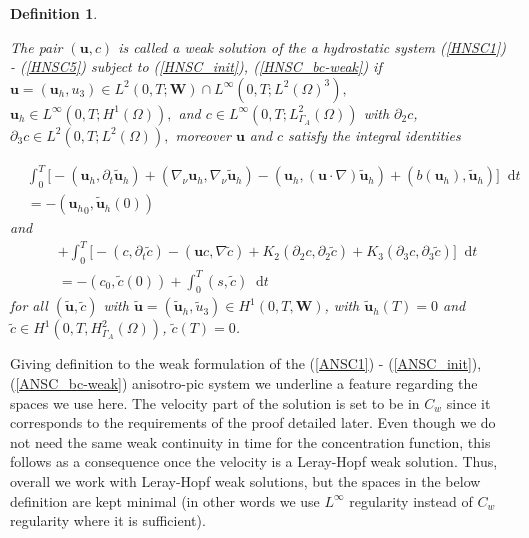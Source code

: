 \documentclass[11pt, a4paper]{article}
\newtheorem{definition}{Definition}
\newcommand*\diff{\mathop{}\!\mathrm{d}}
\begin{document}
\begin{definition} \label{definitionhydrostaticWF}

The pair $(\mathbf{u}, c)$ is called a weak solution of the a hydrostatic system (\ref{HNSC1}) - (\ref{HNSC5}) subject to (\ref{HNSC_init}), (\ref{HNSC_bc-weak}) if $\mathbf{u} = (\mathbf{u}_h, u_3) \in L^2 (0, T; \mathbf{W}) \cap L^\infty (0,T; L^2(\Omega)^3),$ $\mathbf{u}_h \in L^\infty(0,T; H^1(\Omega)),$ and $c \in L^\infty (0, T; L_{\Gamma_A}^2(\Omega))$ with $\partial_2 c$, $\partial_3 c \in L^2(0, T; L^2(\Omega)),$ moreover $\mathbf{u}$ and $c$ satisfy the integral identities

\begin{equation}
\begin{split}
& \int_0^T \bigg[ -(\mathbf{u}_h, \partial_t \mathbf{\tilde{u}}_h) + (\nabla_\nu \mathbf{u}_h, \nabla_\nu \mathbf{\tilde{u}}_h) - (\mathbf{u}_h, (\mathbf{u} \cdot \nabla) \mathbf{\tilde{u}}_h) + (b(\mathbf{u}_h), \mathbf{\tilde{u}}_h) \bigg ] \diff t \\
& = - ({\mathbf{u}_h}_0, \mathbf{\tilde{u}}_h(0)) \label{hydrostaticWF_u}
\end{split}
\end{equation}
%
and
%
\begin{equation}
\begin{split} 
&+ \int_0^T \bigg[ -(c, \partial_t \tilde{c}) -(\mathbf{u}c, \nabla \tilde{c}) + K_2 (\partial_2 c, \partial_2 \tilde{c}) + K_3 (\partial_3 c, \partial_3 \tilde{c}) \bigg ] \diff t \\
& = - (c_0, \tilde{c}(0)) + \int_0^T (s,\tilde{c}) \diff t \label{hydrostaticWF_c}
\end{split}
\end{equation}
%
for all $(\mathbf{\tilde{u}}, \tilde{c})$ with $\mathbf{\tilde{u}} = (\mathbf{\tilde{u}}_h, \tilde{u}_3) \in H^1 (0,T, \mathbf{W})$, with $\mathbf{\tilde{u}}_h (T) = 0$ and $\tilde{c} \in H^1 (0,T, H^2_{\Gamma_A} (\Omega))$, $\tilde{c} (T) = 0$.

\end{definition}

Giving definition to the weak formulation of the (\ref{ANSC1}) - (\ref{ANSC_init}), (\ref{ANSC_bc-weak}) anisotro-pic system we underline a feature regarding the spaces we use here. The velocity part of the solution is set to be in $C_w$ since it corresponds to the requirements of the proof detailed later. Even though we do not need the same weak continuity in time for the concentration function, this follows as a consequence once the velocity is a Leray-Hopf weak solution. Thus, overall we work with Leray-Hopf weak solutions, but the spaces in the below definition are kept minimal (in other words we use $L^\infty$ regularity instead of $C_w$ regularity where it is sufficient).
\end{document}
